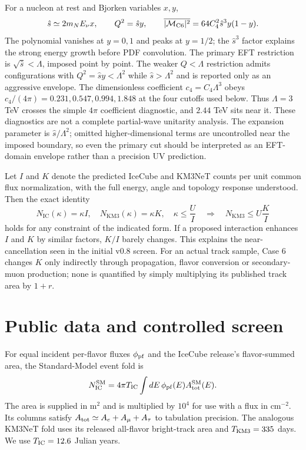 \documentclass[11pt,a4paper]{article}
\begin{document}
For a nucleon at rest and Bjorken variables $x,y$,
\begin{equation}
 \hat s\simeq 2m_NE_\nu x,\qquad Q^2=\hat s y,
 \qquad \overline{|{\cal M}_{\mathrm{C6}}|^2}
 =64 C_4^2\hat s^3y(1-y).
 \label{eq:kinematics}
\end{equation}
The polynomial vanishes at $y=0,1$ and peaks at $y=1/2$; the $\hat s^3$
factor explains the strong energy growth before PDF convolution.  The
primary EFT restriction is $\sqrt{\hat s}<\Lambda$, imposed point by
point.  The weaker $Q<\Lambda$ restriction admits configurations with
$Q^2=\hat s y<\Lambda^2$ while $\hat s>\Lambda^2$ and is reported only as an
aggressive envelope.  The dimensionless coefficient
$c_4=C_4\Lambda^3$ obeys $c_4/(4\pi)=0.231,0.547,0.994,1.848$ at the four
cutoffs used below.  Thus $\Lambda=3$ TeV crosses the simple $4\pi$
coefficient diagnostic, and $2.44$ TeV sits near it.  These diagnostics are
not a complete partial-wave unitarity analysis.  The expansion parameter
is $\hat s/\Lambda^2$; omitted higher-dimensional terms are uncontrolled
near the imposed boundary, so even the primary cut should be interpreted
as an EFT-domain envelope rather than a precision UV prediction.

Let $I$ and $K$ denote the predicted IceCube and KM3NeT counts per unit
common flux normalization, with the full energy, angle and topology
response understood.  Then the exact identity
\begin{equation}
 N_{\mathrm{IC}}(\kappa)=\kappa I,
 \quad N_{\mathrm{KM3}}(\kappa)=\kappa K,
 \quad \kappa\leq\frac{U}{I}
 \quad\Longrightarrow\quad
 N_{\mathrm{KM3}}\leq U\frac{K}{I}
 \label{eq:ratio}
\end{equation}
holds for any constraint of the indicated form.  If a proposed interaction
enhances $I$ and $K$ by similar factors, $K/I$ barely changes.  This
explains the near-cancellation seen in the initial v0.8 screen.  For an
actual track sample, Case 6 changes $K$ only indirectly through
propagation, flavor conversion or secondary-muon production; none is
quantified by simply multiplying its published track area by $1+r$.

\section{Public data and controlled screen}
For equal incident per-flavor fluxes $\phi_{\rm pf}$ and the IceCube release's
flavor-summed area, the Standard-Model event fold is
\begin{equation}
 N_{\rm IC}^{\rm SM}=4\pi T_{\rm IC}\int dE\,
 \phi_{\rm pf}(E)A_{\rm tot}^{\rm SM}(E).
 \label{eq:fold}
\end{equation}
The area is supplied in $\mathrm{m}^2$ and is multiplied by $10^4$ for use
with a flux in $\mathrm{cm}^{-2}$.  Its columns satisfy
$A_{\rm tot}\simeq A_e+A_\mu+A_\tau$ to tabulation precision.
The analogous KM3NeT fold uses its released all-flavor bright-track area
and $T_{\rm KM3}=335$ days.  We use $T_{\rm IC}=12.6$ Julian years.
\end{document}

